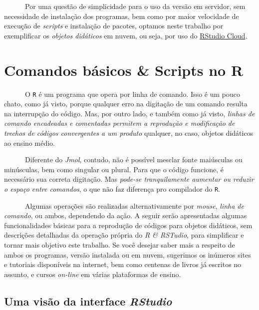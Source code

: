 \documentclass[
  letterpaper,
  DIV=11,
  numbers=noendperiod]{scrreprt}
\begin{document}
~~~~~~Por uma questão de simplicidade para o uso da versão em servidor,
sem necessidade de instalação dos programas, bem como por maior
velocidade de execução de \emph{scripts} e instalação de pacotes,
optamos neste trabalho por exemplificar os \emph{objetos didáticos} em
nuvem, ou seja, por uso do \href{https://posit.cloud/}{RStudio Cloud}.


\chapter{Comandos básicos \& Scripts no
R}\label{comandos-buxe1sicos-scripts-no-r}

~~~~~~O \texttt{R} é um programa que opera por linha de comando. Isso é
um pouco chato, como já visto, porque qualquer erro na digitação de um
comando resulta na interrupção do código. Mas, por outro lado, e também
como já visto, \emph{linhas de comando encadeadas e comentadas permitem
a reprodução e modificação de trechos de códigos convergentes a um
produto} qualquer, no caso, objetos didáticos ao ensino médio.

~~~~~~Diferente do \emph{Jmol}, contudo, não é possível mesclar fonte
maiúsculas ou minúsculas, bem como singular ou plural. Para que o código
funcione, é necessário sua correta digitação. Mas \emph{pode-se
tranquilamente aumentar ou reduzir o espaço entre comandos}, o que não
faz diferença pro compilador do \texttt{R}.

~~~~~~Algumas operações são realizadas alternativamente por
\emph{mouse}, \emph{linha de comando}, ou ambos, dependendo da ação. A
seguir serão apresentadas algumas funcionalidades básicas para a
reprodução de códigos para objetos didáticos, sem descrições detalhadas
da operação própria do \emph{R \& RSTudio}, para simplificar e tornar
mais objetivo este trabalho. Se você desejar saber mais a respeito de
ambos os programas, versão instalada ou em nuvem, sugerimos os inúmeros
sites e tutoriais disponíveis na internet, bem como centenas de livros
já escritos no assunto, e cursos \emph{on-line} em várias plataformas de
ensino.

\hfill\break

\section{\texorpdfstring{Uma visão da interface
\emph{RStudio}}{Uma visão da interface RStudio}}\label{uma-visuxe3o-da-interface-rstudio}
\end{document}
